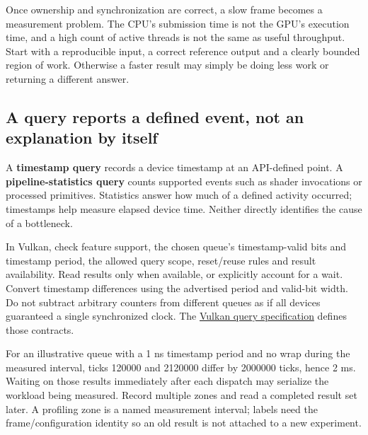 \hypertarget{03-visual-computing-i-ch016-measure-the-limiting-resource-before-changing-the-arithmetic}{}

Once ownership and synchronization are correct, a slow frame becomes a measurement problem. The CPU's submission time is not the GPU's execution time, and a high count of active threads is not the same as useful throughput. Start with a reproducible input, a correct reference output and a clearly bounded region of work. Otherwise a faster result may simply be doing less work or returning a different answer.

\subsection{A query reports a defined event, not an explanation by itself}\label{03-visual-computing-i-ch016-a-query-reports-a-defined-event-not-an-explanation-by-itself}

\hypertarget{03-visual-computing-i-ch016-a-query-reports-a-defined-event-not-an-explanation-by-itself}{}

A \textbf{timestamp query} records a device timestamp at an API-defined point. A \textbf{pipeline-statistics query} counts supported events such as shader invocations or processed primitives. Statistics answer how much of a defined activity occurred; timestamps help measure elapsed device time. Neither directly identifies the cause of a bottleneck.

In Vulkan, check feature support, the chosen queue's timestamp-valid bits and timestamp period, the allowed query scope, reset/reuse rules and result availability. Read results only when available, or explicitly account for a wait. Convert timestamp differences using the advertised period and valid-bit width. Do not subtract arbitrary counters from different queues as if all devices guaranteed a single synchronized clock. The \href{https://docs.vulkan.org/spec/latest/chapters/queries.html}{Vulkan query specification} defines those contracts.

For an illustrative queue with a 1 ns timestamp period and no wrap during the measured interval, ticks 120000 and 2120000 differ by 2000000 ticks, hence 2 ms. Waiting on those results immediately after each dispatch may serialize the workload being measured. Record multiple zones and read a completed result set later. A profiling zone is a named measurement interval; labels need the frame/configuration identity so an old result is not attached to a new experiment.


